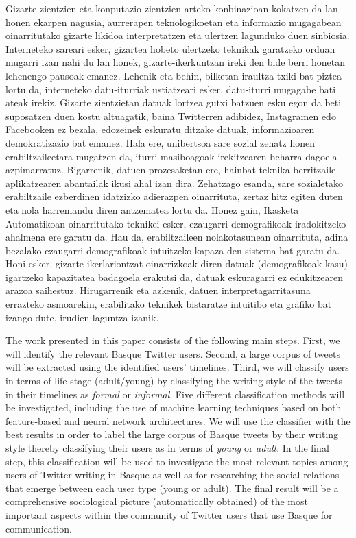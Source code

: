 \documentclass[information,article,submit,moreauthors,pdftex,10pt,a4paper]{Definitions/mdpi}
\begin{document}
\indent Gizarte-zientzien eta konputazio-zientzien arteko konbinazioan kokatzen da lan honen ekarpen nagusia, aurrerapen teknologikoetan eta informazio mugagabean oinarritutako gizarte likidoa \citep{bauman2015modernidad} interpretatzen eta ulertzen lagunduko duen sinbiosia. Interneteko sareari esker, gizartea hobeto ulertzeko teknikak garatzeko orduan mugarri izan nahi du lan honek, gizarte-ikerkuntzan ireki den bide berri honetan lehenengo pausoak emanez. Lehenik eta behin, bilketan iraultza txiki bat piztea lortu da, interneteko datu-iturriak ustiatzeari esker, datu-iturri mugagabe bati ateak irekiz. Gizarte zientzietan datuak lortzea gutxi batzuen esku egon da beti suposatzen duen kostu altuagatik, baina Twitterren adibidez, Instagramen edo Facebooken ez bezala, edozeinek eskuratu ditzake datuak, informazioaren demokratizazio bat emanez. Hala ere, unibertsoa sare sozial zehatz honen erabiltzaileetara mugatzen da, iturri masiboagoak irekitzearen beharra dagoela azpimarratuz. Bigarrenik, datuen prozesaketan ere, hainbat teknika berritzaile aplikatzearen abantailak ikusi ahal izan dira. Zehatzago esanda, sare sozialetako erabiltzaile ezberdinen idatzizko adierazpen oinarrituta, zertaz hitz egiten duten eta nola harremandu diren antzematea lortu da. Honez gain, Ikasketa Automatikoan oinarritutako teknikei esker, ezaugarri demografikoak iradokitzeko ahalmena ere garatu da. Hau da, erabiltzaileen nolakotasunean oinarrituta, adina bezalako ezaugarri demografikoak intuitzeko kapaza den sistema bat garatu da. Honi esker, gizarte ikerlariontzat oinarrizkoak diren datuak (demografikoak kasu) igartzeko kapazitatea badagoela erakutsi da, datuak eskuragarri ez edukitzearen arazoa saihestuz. Hirugarrenik eta azkenik, datuen interpretagarritasuna errazteko asmoarekin, erabilitako teknikek bistaratze intuitibo eta grafiko bat izango dute, irudien laguntza izanik.

The work presented in this paper consists of the following main steps. First, we will identify the relevant Basque Twitter users. Second, a large corpus of tweets will be extracted using the identified users' timelines. Third, we will classify users in terms of life stage (adult/young) by classifying the writing style of the tweets in their timelines as \emph{formal} or \emph{informal}. Five different classification methods will be investigated, including the use of machine learning techniques based on both feature-based and neural network architectures. We will use the classifier with the best results in order to label the large corpus of Basque tweets by their writing style thereby classifying their users as in terms of \emph{young} or \emph{adult}. In the final step, this classification will be used to investigate the most relevant topics among users of Twitter writing in Basque as well as for researching the social relations that emerge between each user type (young or adult). The final result will be a comprehensive sociological picture (automatically obtained) of the most important aspects within the community of Twitter users that use Basque for communication.
\end{document}
